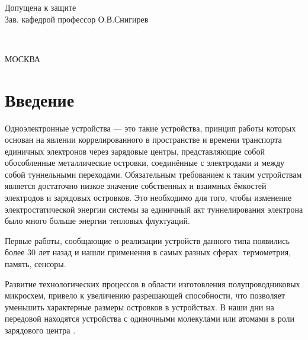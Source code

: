 \documentclass[12pt,a4paper]{report}
\renewcommand{\small}{\fontsize{12}{14.5pt}\selectfont}
\renewcommand{\normalsize}{\fontsize{14}{18pt}\selectfont}
\begin{document}
\begin{titlepage}
\begin{flushright}
\end{flushright}

\vspace{1cm}
\begin{flushleft}
Допущена к защите \\
Зав. кафедрой профессор О.В.Снигирев

\underline{\hspace{3cm}} \\
\end{flushleft}
\begin{center}
\vspace{1cm}
\small МОСКВА \\ \number\year\normalsize
\end{center}
\end{titlepage}



\setcounter{page}{2}
\tableofcontents

\chapter*{Введение}

Одноэлектронные устройства — это такие устройства, принцип работы которых основан на явлении коррелированного в пространстве и времени транспорта единичных электронов через зарядовые центры, представляющие собой обособленные металлические островки, соединённые с электродами и между собой туннельными переходами. Обязательным требованием к таким устройствам является достаточно низкое значение собственных и взаимных ёмкостей электродов и зарядовых островков. Это необходимо для того, чтобы изменение электростатической энергии системы за единичный акт туннелирования электрона было много больше энергии тепловых флуктуаций.

Первые работы, сообщающие о реализации устройств данного типа появились более 30 лет назад \cite{Fulton_Dolan, Amman, Likharev} и нашли применения в самых разных сферах:  термометрия\cite{Thermo}, память\cite{memory}, сенсоры\cite{sensor}.

Развитие технологических процессов в области изготовления полупроводниковых микросхем, привело к увеличению разрешающей способности, что позволяет уменьшить характерные размеры островков в устройствах. В наши дни на передовой находятся устройства с одиночными молекулами или атомами в роли зарядового центра \cite{SASET_EXP_OUR, SMSET}.
\end{document}
